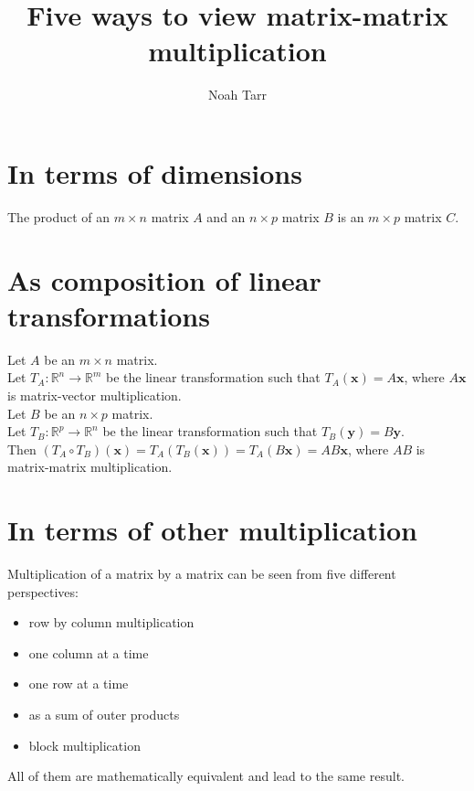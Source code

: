 \documentclass{scrartcl}
\title{Five ways to view matrix-matrix multiplication}
\author{Noah Tarr}
\date{}
\begin{document}
\maketitle

\section{In terms of dimensions}
The product of an \(m \times n\) matrix \(A\) and an \(n \times p\) matrix \(B\) is an \(m \times p\) matrix \(C\).

\section{As composition of linear transformations}
Let \(A\) be an \(m \times n\) matrix.\\
Let \(T_A : \mathbb{R}^n \to \mathbb{R}^m\) be the linear transformation such that \(T_A(\mathbf{x}) = A\mathbf{x}\), where \(A\mathbf{x}\) is matrix-vector multiplication.\\
Let \(B\) be an \(n \times p\) matrix.\\
Let \(T_B : \mathbb{R}^p \to \mathbb{R}^n \) be the linear transformation such that \(T_B(\mathbf{y}) = B\mathbf{y}\).\\
Then \((T_A \circ T_B)(\mathbf{x}) = T_A(T_B(\mathbf{x})) = T_A(B\mathbf{x}) = AB\mathbf{x}\), where \(AB\) is matrix-matrix multiplication.

\section{In terms of other multiplication}
Multiplication of a matrix by a matrix can be seen from five different perspectives:

\begin{itemize}
\item row by column multiplication
\item one column at a time
\item one row at a time
\item as a sum of outer products
\item block multiplication
\end{itemize}

All of them are mathematically equivalent and lead to the same result.
\end{document}
